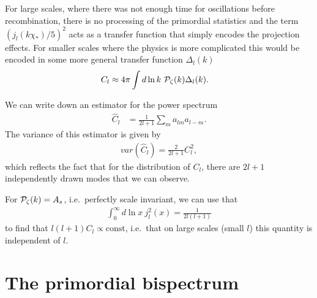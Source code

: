     For large scales, where there was not enough time for oscillations
    before recombination, there is no processing of the primordial statistics
    and the term $\left(j_l(k\chi_*)/5\right)^2$ acts as a transfer
    function that simply encodes the projection effects.
    For smaller scales where the physics is more complicated this would be encoded in
    some more general transfer function $\Delta_l(k)$
    \begin{align}\label{eqn:transfer_function}
        C_l &\approx 4\pi\int d\ln k~\mathcal{P}_{\mathcal{\zeta}}(k)
            \Delta_l(k).
    \end{align}


    We can write down an estimator for the power spectrum
    \begin{align}
        \hat{C}_l &= \frac{1}{2l+1}\sum_m a_{lm} a_{l-m}.
    \end{align}
    The variance of this estimator is given by
    \begin{align}
        var\left(\hat{C}_l\right) = \frac{2}{2l+1} C^2_l,
    \end{align}
    which reflects the fact that for the distribution of $C_l$,
    there are $2l+1$ independently drawn modes that we can observe.


    For $\mathcal{P}_{\mathcal{\zeta}}(k)=A_s$, i.e.\ perfectly scale invariant,
    we can use that
    \begin{align}
        \int_0^{\infty}d\ln x~j_l^2(x) = \frac{1}{2l(l+1)}
    \end{align}
    to find that $l(l+1)C_l\propto \text{const}$, i.e.\ that on large scales
    (small $l$) this quantity is independent of $l$.




\section{The primordial bispectrum}
